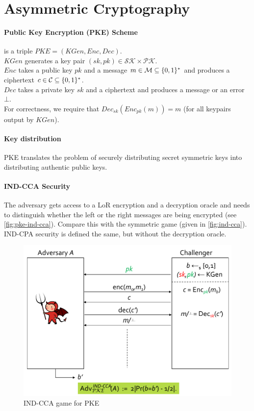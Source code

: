 
\section{Asymmetric Cryptography}

\paragraph{Public Key Encryption (PKE) Scheme}
is a triple $PKE = (KGen, Enc, Dec)$.
\\
$KGen$ generates a key pair $(sk, pk) \in \mathcal{SK} \times \mathcal{PK}$. \\
$Enc$ takes a public key $pk$ and a message $m \in \mathcal{M} \subseteq \lbrace 0, 1 \rbrace^*$
and produces a ciphertext $c \in \mathcal{C} \subseteq \lbrace 0, 1 \rbrace^*$. \\
$Dec$ takes a private key $sk$ and a ciphertext and produces a message or an error $\bot$.
\\
For correctness, we require that $Dec_{sk}( Enc_{pk}(m) ) = m$ (for all keypairs output by $KGen$).

\paragraph{Key distribution}
PKE translates the problem of securely distributing secret symmetric keys into
distributing authentic public keys.

\paragraph{IND-CCA Security}
The adversary gets access to a LoR encryption and a decryption oracle and needs to
distinguish whether the left or the right messages are being encrypted
(see \autoref{fig:pke-ind-cca}).
Compare this with the symmetric game (given in \autoref{fig:ind-cca}).
\\
IND-CPA security is defined the same, but without the decryption oracle.

\begin{figure}[h]
    \centering
	\includegraphics[scale=0.4]{images/pke-ind-cca.png}
    \caption{IND-CCA game for PKE}
    \label{fig:pke-ind-cca}
\end{figure}

